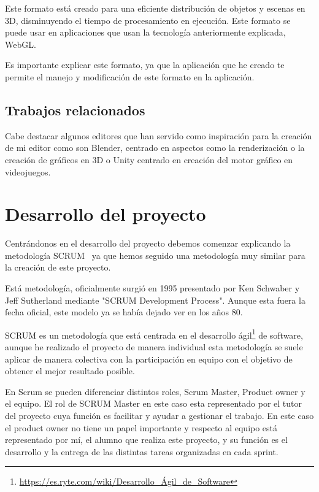 \documentclass[a4paper, 12pt]{book}
\begin{document}
Este formato está creado para una eficiente distribución de objetos y escenas en 3D, disminuyendo el tiempo de procesamiento en ejecución. Este formato se puede usar en aplicaciones que usan la tecnología anteriormente explicada, WebGL.

Es importante explicar este formato, ya que la aplicación que he creado te permite el manejo y  modificación de este formato en la aplicación.

\section{Trabajos relacionados} %
\label{sec:Otros}
Cabe destacar algunos editores que han servido como inspiración para la creación de mi editor como son Blender, centrado en aspectos como la renderización o la creación de gráficos en 3D o Unity centrado en creación del motor gráfico en videojuegos. 


\cleardoublepage
\chapter{Desarrollo del proyecto}
\label{chap:Desarrollo del proyecto}
Centrándonos en el desarrollo del proyecto debemos comenzar explicando la metodología SCRUM~\cite{proyectos} ya que hemos seguido una metodología muy similar para la creación de este proyecto.

Está metodología, oficialmente surgió en 1995 presentado por Ken Schwaber y Jeff Sutherland mediante "SCRUM Development Process". Aunque esta fuera la fecha oficial, este modelo ya se había dejado ver en los años 80.

SCRUM es un metodología que está centrada en el desarrollo ágil\footnote{\url{https://es.ryte.com/wiki/Desarrollo_Ágil_de_Software}}  de software, aunque he realizado el proyecto de manera individual esta metodología se suele aplicar de manera colectiva con la participación en equipo con el objetivo de obtener el mejor resultado posible.

En Scrum se pueden diferenciar distintos roles, Scrum Master, Product owner y el equipo. El rol de SCRUM Master en este caso esta representado por el tutor del proyecto cuya función es facilitar y ayudar a gestionar el trabajo. En este caso el product owner no tiene un papel importante y respecto al equipo está representado por mí, el alumno que realiza este proyecto, y su función es el desarrollo y la entrega de las distintas tareas organizadas en cada sprint.
\end{document}
